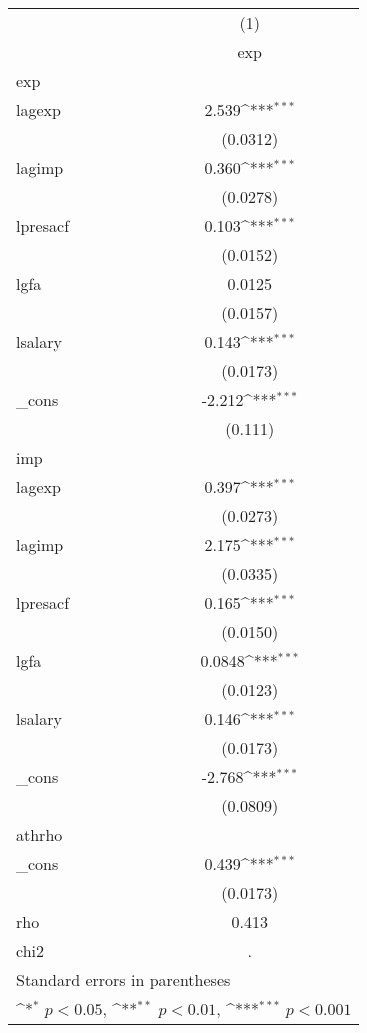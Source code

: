 {
\def\sym#1{\ifmmode^{#1}\else\(^{#1}\)\fi}
\begin{tabular}{l*{1}{c}}
\hline\hline
            &\multicolumn{1}{c}{(1)}\\
            &\multicolumn{1}{c}{exp}\\
\hline
exp         &                     \\
lagexp      &       2.539\sym{***}\\
            &    (0.0312)         \\
[1em]
lagimp      &       0.360\sym{***}\\
            &    (0.0278)         \\
[1em]
lpresacf    &       0.103\sym{***}\\
            &    (0.0152)         \\
[1em]
lgfa        &      0.0125         \\
            &    (0.0157)         \\
[1em]
lsalary     &       0.143\sym{***}\\
            &    (0.0173)         \\
[1em]
\_cons      &      -2.212\sym{***}\\
            &     (0.111)         \\
\hline
imp         &                     \\
lagexp      &       0.397\sym{***}\\
            &    (0.0273)         \\
[1em]
lagimp      &       2.175\sym{***}\\
            &    (0.0335)         \\
[1em]
lpresacf    &       0.165\sym{***}\\
            &    (0.0150)         \\
[1em]
lgfa        &      0.0848\sym{***}\\
            &    (0.0123)         \\
[1em]
lsalary     &       0.146\sym{***}\\
            &    (0.0173)         \\
[1em]
\_cons      &      -2.768\sym{***}\\
            &    (0.0809)         \\
\hline
athrho      &                     \\
\_cons      &       0.439\sym{***}\\
            &    (0.0173)         \\
\hline
rho         &       0.413         \\
chi2        &           .         \\
\hline\hline
\multicolumn{2}{l}{\footnotesize Standard errors in parentheses}\\
\multicolumn{2}{l}{\footnotesize \sym{*} \(p<0.05\), \sym{**} \(p<0.01\), \sym{***} \(p<0.001\)}\\
\end{tabular}
}
